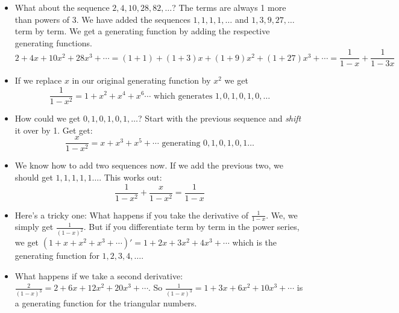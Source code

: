 \begin{itemize}
 \item What about the sequence $2, 4, 10, 28, 82, \ldots$?  The terms are always 1 more than powers of 3.  We have added the sequences $1,1,1,1,\ldots$ and $1,3,9, 27,\ldots$ term by term.  We get a generating function by adding the respective generating functions.
 \[2 + 4x + 10x^2 + 28x^3 + \cdots  = (1 + 1) + (1 + 3)x + (1 + 9)x^2 + (1 + 27)x^3 + \cdots = \frac{1}{1-x} + \frac{1}{1-3x}\]
 
 \item If we replace $x$ in our original generating function by $x^2$ we get
 \[\frac{1}{1-x^2} = 1 + x^2  + x^4 + x^6\cdots \mbox{ which generates } 1, 0, 1, 0, 1, 0, \ldots\]
 
 \item How could we get $0,1,0,1,0,1,\ldots$?  Start with the previous sequence and {\em shift} it over by 1.  Get get:
 \[\frac{x}{1-x^2} = x + x^3 + x^5 + \cdots \mbox{ generating } 0, 1, 0, 1, 0 , 1 \ldots\]
 
 \item We know how to add two sequences now.  If we add the previous two, we should get $1,1,1,1,1\ldots$.  This works out:
 \[\frac{1}{1-x^2} + \frac{x}{1-x^2} = \frac{1}{1-x}\]
 
 \item Here's a tricky one: What happens if you take the derivative of $\frac{1}{1-x}$.  We, we simply get $\frac{1}{(1-x)^2}$.  But if you differentiate term by term in the power series, we get $(1 + x + x^2 + x^3 + \cdots)' = 1 + 2x + 3x^2 + 4x^3 + \cdots $ which is the generating function for $1, 2, 3, 4, \ldots$.
 
 \item What happens if we take a second derivative: $\frac{2}{(1-x)^3} = 2 + 6x + 12x^2 + 20x^3 + \cdots$.  So $\frac{1}{(1-x)^3} = 1 + 3x + 6x^2 + 10x^3 + \cdots$ is a generating function for the triangular numbers.
 
 
\end{itemize}



